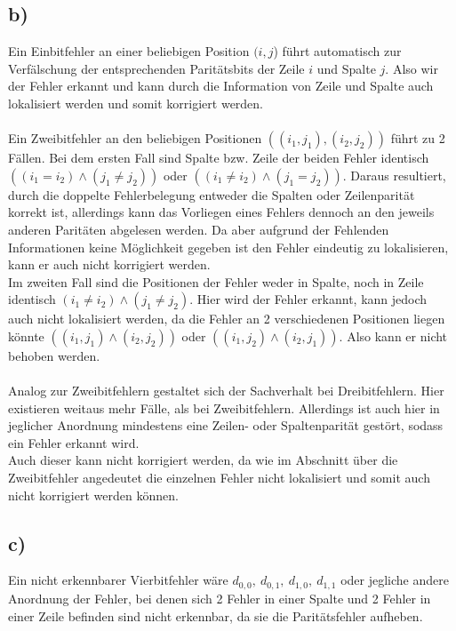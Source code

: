 \documentclass[a4paper]{scrartcl}
\begin{document}
	\subsection{b)}
		Ein Einbitfehler an einer beliebigen Position \((i,j\)) führt automatisch zur Verfälschung
		der	entsprechenden Paritätsbits der Zeile \(i\) und Spalte \(j\). Also wir der Fehler erkannt
		und	kann durch die Information von Zeile und Spalte auch lokalisiert werden und somit
		korrigiert werden. \\
		\\		
		Ein Zweibitfehler an den beliebigen Positionen \(((i_1,j_1),(i_2,j_2))\) führt zu 2 Fällen.
		Bei dem ersten Fall sind Spalte bzw. Zeile der beiden Fehler identisch
		\(((i_1 = i_2)\land(j_1\neq j_2))\) oder \(((i_1\neq i_2)\land(j_1 = j_2))\). Daraus
		resultiert,	durch die doppelte Fehlerbelegung entweder die Spalten oder Zeilenparität korrekt
		ist, allerdings kann das Vorliegen eines Fehlers dennoch an den jeweils anderen Paritäten 
		abgelesen werden. Da aber aufgrund der Fehlenden Informationen keine Möglichkeit gegeben ist
		den Fehler eindeutig zu lokalisieren, kann er auch nicht korrigiert werden. \\
		Im zweiten Fall sind die Positionen der Fehler weder in Spalte, noch in Zeile identisch
		\((i_1\neq i_2)\land(j_1\neq j_2)\). Hier wird der Fehler erkannt, kann jedoch auch nicht 
		lokalisiert werden, da die Fehler an 2 verschiedenen Positionen liegen könnte
		\(((i_1,j_1)\land(i_2,j_2))\) oder \(((i_1,j_2)\land(i_2,j_1))\). Also kann er nicht behoben 
		werden. \\
		\\
		Analog zur Zweibitfehlern gestaltet sich der Sachverhalt bei Dreibitfehlern. Hier existieren 
		weitaus mehr Fälle, als bei Zweibitfehlern. Allerdings ist auch hier in jeglicher Anordnung 
		mindestens eine Zeilen- oder Spaltenparität gestört, sodass ein Fehler erkannt wird. \\
		Auch dieser kann nicht korrigiert werden, da wie im Abschnitt über die Zweibitfehler 
		angedeutet die einzelnen Fehler nicht lokalisiert und somit auch nicht korrigiert werden 
		können.	
		
		
	\subsection{c)}
		Ein nicht erkennbarer Vierbitfehler wäre \(d_{0,0},\ d_{0,1},\ d_{1,0},\ d_{1,1}\) oder 
		jegliche andere Anordnung der Fehler, bei denen sich 2 Fehler in einer Spalte und 2 Fehler in 
		einer Zeile befinden sind nicht erkennbar, da sie die Paritätsfehler aufheben.
		
\end{document}

